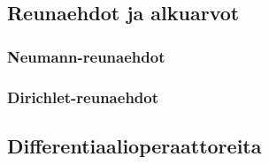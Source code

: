 \documentclass[../johdoksia.tex]{subfiles}
\begin{document}
	\subsection{Reunaehdot ja alkuarvot}
	
	\subsubsection{Neumann-reunaehdot}
	
	\subsubsection{Dirichlet-reunaehdot}
	
	\subsection{Differentiaalioperaattoreita}
	
\end{document}
